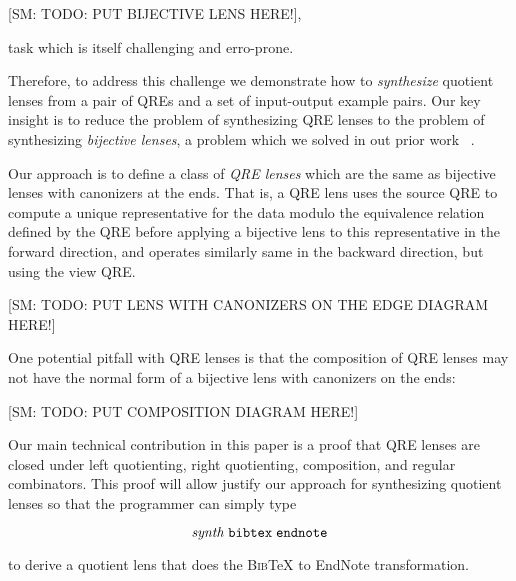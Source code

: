 \documentclass{svproc}
\newcommand{\FINISH}[3]{\ifdraft\textcolor{#1}{[#2: #3]}\fi}
\newcommand{\sam}[1]{\FINISH{dkpurple}{SM}{#1}}
\newcommand{\bibtex}{\textsc{Bib}\TeX{}}
\begin{document}
\sam{TODO: PUT BIJECTIVE LENS HERE!},

\noindent task which is itself challenging and erro-prone.

Therefore, to address this challenge we demonstrate how to {\em synthesize}
quotient lenses from a pair of QREs and a set of input-output example pairs. Our
key insight is to reduce the problem of synthesizing QRE lenses to the problem
of synthesizing {\em bijective lenses}, a problem which we solved in out prior
work ~\cite{popl18}.

Our approach is to define a class of {\em QRE lenses} which are the same as
bijective lenses with canonizers at the ends. That is, a QRE lens uses the
source QRE to compute a unique representative for the data modulo the
equivalence relation defined by the QRE before applying a bijective lens to
this representative in the forward direction, and operates similarly same in the
backward direction, but using the view QRE.

\sam{TODO: PUT LENS WITH CANONIZERS ON THE EDGE DIAGRAM HERE!}

One potential pitfall with QRE lenses is that the composition of QRE lenses may
not have the normal form of a bijective lens with canonizers on the ends:

\sam{TODO: PUT COMPOSITION DIAGRAM HERE!}

Our main technical contribution in this paper is a proof that QRE lenses are
closed under left quotienting, right quotienting, composition, and regular
combinators. This proof will allow justify our approach for synthesizing
quotient lenses so that the programmer can simply type

$$\mathit{synth} \; \verb!bibtex! \; \verb!endnote!$$

to derive a quotient lens that does the \bibtex{} to EndNote transformation.
\end{document}
